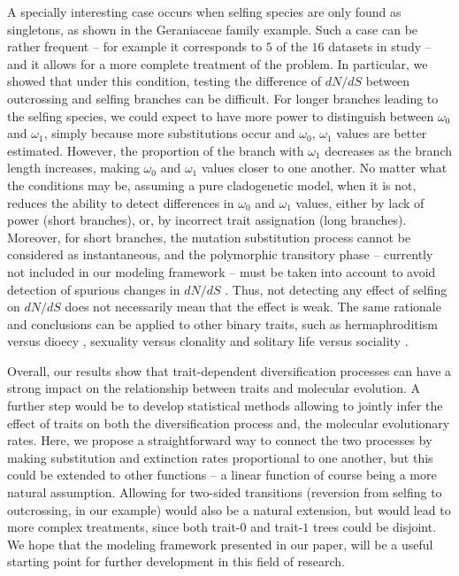 \documentclass[a4paper,11pt]{article}
\theoremstyle{plain}
\theoremstyle{definition}
\numberwithin{equation}{section}
\begin{document}
A specially interesting case occurs when selfing species 
are only found as singletons, as shown in the 
Geraniaceae family example. Such a case can be 
rather frequent -- for example it corresponds to $5$ of 
the $16$ datasets in \cite{glemin_muyle} study -- 
and it allows for a more complete treatment of the problem. 
In particular, we showed that under this condition, testing 
the difference of $dN/dS$ between outcrossing and selfing 
branches can be difficult. For longer branches leading to the 
selfing species, we could expect to have more power to 
distinguish between $\omega_0$ and $\omega_1$, simply 
because more substitutions occur and $\omega_0$, $\omega_1$ 
values are better estimated. However, the proportion of the branch 
with $\omega_1$ decreases as the branch length increases, 
making $\omega_0$ and $\omega_1$ values closer to one another. 
No matter what the conditions may be, assuming a pure cladogenetic model, 
when it is not, reduces the ability to detect differences in 
$\omega_0$ and $\omega_1$ values, either by lack of power 
(short branches), or, by incorrect trait assignation (long branches). 
Moreover, for short branches, the mutation substitution process 
cannot be considered as instantaneous, and the polymorphic 
transitory phase -- currently not included in our modeling framework --  
must be taken into account to avoid detection of spurious changes 
in $dN/dS$ \cite{mugal_etal}. Thus, not detecting any effect of 
selfing on $dN/dS$ does not necessarily mean that the effect is weak. 
The same rationale and conclusions can be applied to other binary traits, 
such as hermaphroditism versus dioecy \cite{kafer_etal}, sexuality 
versus clonality \cite{henry_etal} and solitary life versus sociality 
\cite{romiguier_etal}.

Overall, our results show that trait-dependent diversification processes 
can have a strong impact on the relationship between traits and molecular evolution. 
A further step would be to develop statistical methods allowing to jointly 
infer the effect of traits on both the diversification process and, the 
molecular evolutionary rates. Here, we propose a straightforward way to 
connect the two processes by making substitution and extinction rates 
proportional to one another, but this could be extended to other functions -- a linear 
function of course being a more natural assumption. Allowing 
for two-sided transitions (reversion from selfing to outcrossing, in our example) 
would also be a natural extension, but would lead to more complex 
treatments, since both trait-$0$ and trait-$1$ trees could be disjoint. 
We hope that the modeling framework presented in our paper, 
will be a useful starting point for further development in this field of research.
\end{document}
